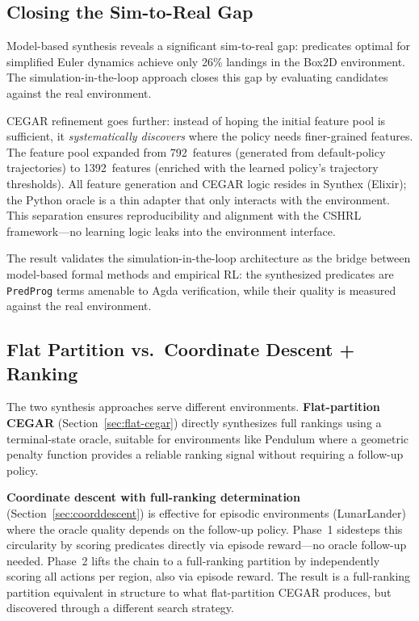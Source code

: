 \documentclass[9pt,a4paper]{article}
\theoremstyle{plain}
\theoremstyle{definition}
\theoremstyle{remark}
\begin{document}
\subsection{Closing the Sim-to-Real Gap}

Model-based synthesis reveals a significant sim-to-real gap:
predicates optimal for simplified Euler dynamics achieve only 26\%
landings in the Box2D environment. The
simulation-in-the-loop approach closes this gap by evaluating
candidates against the real environment.

CEGAR refinement goes further: instead of hoping the initial
feature pool is sufficient, it \emph{systematically discovers}
where the policy needs finer-grained features. The feature pool
expanded from 792~features (generated from default-policy
trajectories) to 1392~features (enriched with the learned policy's
trajectory thresholds). All feature generation and CEGAR logic
resides in Synthex (Elixir); the Python oracle is a thin adapter
that only interacts with the environment. This separation ensures
reproducibility and alignment with the CSHRL framework---no
learning logic leaks into the environment interface.

The result validates the simulation-in-the-loop architecture as the
bridge between model-based formal methods and empirical RL: the
synthesized predicates are \texttt{PredProg} terms amenable to
Agda verification, while their quality is measured against the
real environment.

\subsection{Flat Partition vs.\ Coordinate Descent + Ranking}

The two synthesis approaches serve different environments.
\textbf{Flat-partition CEGAR} (Section~\ref{sec:flat-cegar})
directly synthesizes full rankings using a terminal-state oracle,
suitable for environments like Pendulum where a geometric penalty
function provides a reliable ranking signal without requiring
a follow-up policy.

\textbf{Coordinate descent with full-ranking determination}
(Section~\ref{sec:coorddescent}) is effective for episodic
environments (LunarLander) where the oracle quality depends on
the follow-up policy. Phase~1 sidesteps this circularity by
scoring predicates directly via episode reward---no oracle
follow-up needed. Phase~2 lifts the chain to a full-ranking
partition by independently scoring all actions per region,
also via episode reward. The result is a full-ranking partition
equivalent in structure to what flat-partition CEGAR produces,
but discovered through a different search strategy.
\end{document}
